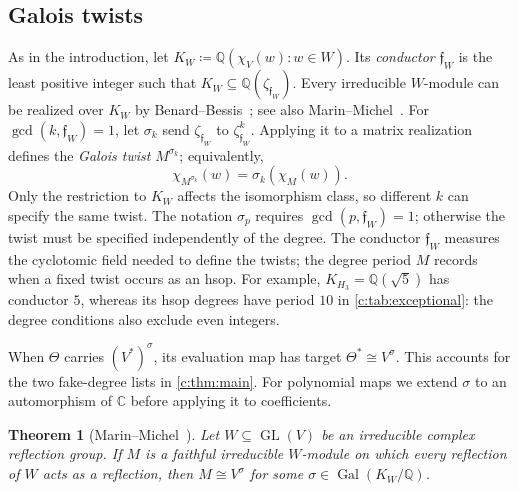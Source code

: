 \documentclass[11pt]{amsart}
\newcommand{\defeq}{\coloneqq}
\newcommand{\defn}[1]{\emph{\color{darkblue}#1}}
\newtheorem{theorem}{Theorem}[section]
\theoremstyle{definition}
\newcommand{\C}{\mathbb C}\newcommand{\Q}{\mathbb Q}
\begin{document}
\subsection{Galois twists}\label{b:sec:galois}


As in the introduction, let $K_W\defeq\Q(\chi_V(w):w\in W)$.
Its \defn{conductor} $\mathfrak f_W$ is the least positive integer
such that $K_W\subseteq\Q(\zeta_{\mathfrak f_W})$. Every irreducible
$W$-module can be realized over $K_W$ by Benard--Bessis~\cite{Benard,BessisField};
see also Marin--Michel~\cite[Introduction]{MarinMichel}.
For $\gcd(k,\mathfrak f_W)=1$, let $\sigma_k$ send
$\zeta_{\mathfrak f_W}$ to $\zeta_{\mathfrak f_W}^k$.
Applying it to a matrix realization defines the \defn{Galois twist}
$M^{\sigma_k}$; equivalently,
\[
 \chi_{M^{\sigma_k}}(w)=\sigma_k(\chi_M(w)).
\]
Only the restriction to $K_W$ affects the isomorphism class, so
different $k$ can specify the same twist. The notation $\sigma_p$
requires $\gcd(p,\mathfrak f_W)=1$; otherwise the twist must be
specified independently of the degree. The conductor $\mathfrak f_W$
measures the cyclotomic field needed to define the twists; the degree
period $M$ records when a fixed twist occurs as an hsop. For example,
$K_{H_3}=\Q(\sqrt5)$ has conductor $5$, whereas its hsop degrees have
period $10$ in \cref{c:tab:exceptional}: the degree conditions also
exclude even integers.

When $\Theta$ carries $(V^*)^\sigma$, its evaluation map has
target $\Theta^*\cong V^\sigma$. This accounts for the two fake-degree lists in
\cref{c:thm:main}. For polynomial maps we extend $\sigma$ to an
automorphism of $\C$ before applying it to coefficients.

\begin{theorem}[{Marin--Michel~\cite[Theorem~1.2]{MarinMichel}}]
\label{b:thm:MarinMichel}
Let $W\subseteq\operatorname{GL}(V)$ be an irreducible complex
reflection group. If $M$ is a faithful irreducible $W$-module on which
every reflection of $W$ acts as a reflection, then $M\cong V^\sigma$
for some $\sigma\in\operatorname{Gal}(K_W/\Q)$.
\end{theorem}
\end{document}
